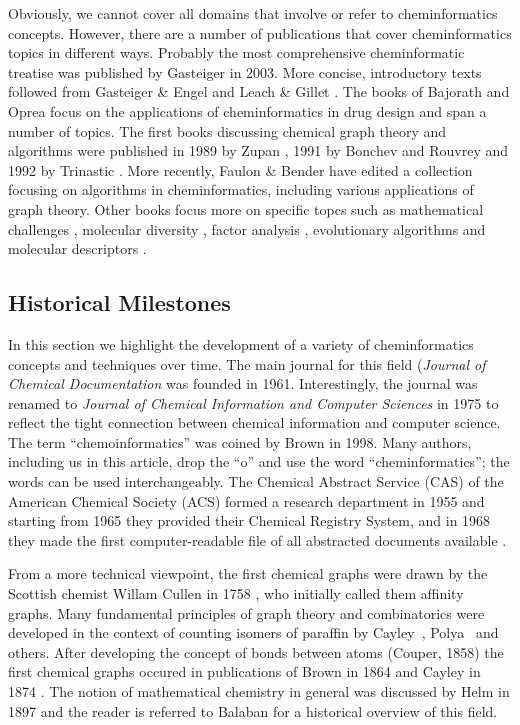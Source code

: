 \documentclass{sig-alternate}
\begin{document}
Obviously, we cannot cover all domains that involve or refer to
cheminformatics concepts. However, there are a number of publications
that cover cheminformatics topics in different ways.  Probably the
most comprehensive cheminformatic treatise was published by Gasteiger
\cite{Gasteiger2003} in 2003.  More concise, introductory texts
followed from Gasteiger \& Engel \cite{gasteigerengel2003} and Leach
\& Gillet \cite{leachgillet2007}.  The books of Bajorath
\cite{Bajorath2004} and Oprea \cite{oprea2005} focus on the
applications of cheminformatics in drug design and span a number of
topics. The first books discussing chemical graph theory and
algorithms were published in 1989 by Zupan \cite{zupan1989}, 1991 by
Bonchev and Rouvrey \cite{bonchevrouvrey1991,bonchevrouvrey2003} and
1992 by Trinastic \cite{Trinajstic1992}.  More recently, Faulon \&
Bender \cite{faulon2010} have edited a collection focusing on
algorithms in cheminformatics, including various applications of graph
theory.  Other books focus more on specific topcs such as mathematical
challenges \cite{mathchallenges1995}, molecular diversity
\cite{moleculardiversity1999}, factor analysis \cite{Malinowski2002},
evolutionary algorithms \cite{clark2000} and molecular descriptors
\cite{todeschini2000}.

\subsection{Historical Milestones}
In this section we highlight the development of a variety of
cheminformatics concepts and techniques over time. The main journal for this field
(\textit{Journal of Chemical Documentation} was founded in
1961. Interestingly, the journal was renamed to \textit{Journal of
  Chemical Information and Computer Sciences} in 1975 to reflect the
tight connection between chemical information and computer
science. The term
``chemoinformatics'' was coined by Brown in
1998\cite{brown1998}.  Many authors, including us in this article, drop the ``o'' and use the word ``cheminformatics''; the words can be used interchangeably.  The Chemical Abstract Service (CAS) of the American Chemical
Society (ACS) formed a research department in 1955 and starting from
1965 they provided their Chemical Registry System, and in 1968 they
made the first computer-readable file of all abstracted documents
available \cite{Chen2006}.

From a more technical viewpoint, the first chemical graphs were drawn
by the Scottish chemist Willam Cullen in 1758
\cite{bonchevrouvrey1991}, who initially called them affinity graphs.  Many fundamental principles of graph theory and
combinatorics were developed in the context of counting isomers of
paraffin by Cayley~\cite{CayleyTrees}, Polya~\cite{PolyaEnumeration} and others.
After developing the concept of bonds between atoms (Couper, 1858) the
first chemical graphs occured in publications of Brown in 1864 and
Cayley in 1874 \cite{bonchevrouvrey1991,brown2009}. The notion of
mathematical chemistry in general was discussed by Helm in 1897
\cite{Helm:1897ys} and the reader is referred to Balaban
\cite{Balaban:2005zr} for a historical overview of this field.
\end{document}

